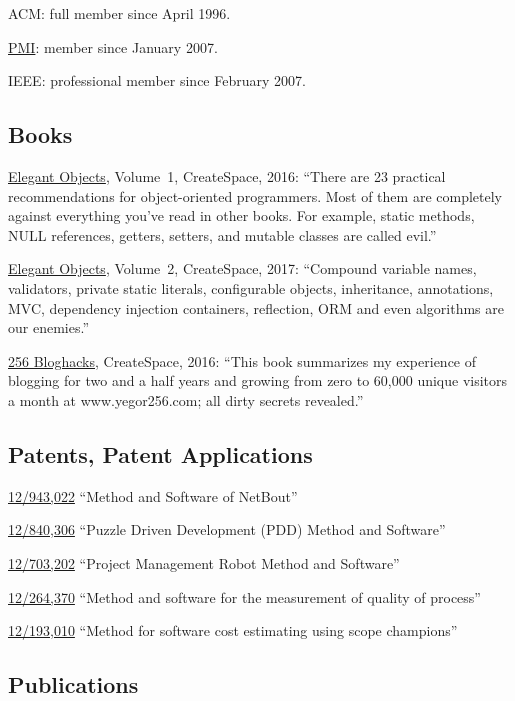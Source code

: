 \documentclass[12pt]{article}
\begin{document}
ACM: full member since April 1996.

\href{https://certification.pmi.org/registry.aspx}{PMI}: member since January 2007.

IEEE: professional member since February 2007.

\subsection*{Books}

\href{https://amzn.to/2E5UHqZ}{Elegant Objects}, Volume~1, CreateSpace, 2016:
``There are 23 practical recommendations for object-oriented programmers. Most of them are completely
against everything you've read in other books.
For example, static methods, NULL references, getters, setters, and
mutable classes are called evil.''

\href{https://amzn.to/2J2s5T4}{Elegant Objects}, Volume~2, CreateSpace, 2017:
``Compound variable names, validators, private static literals, configurable objects, inheritance,
annotations, MVC, dependency injection containers, reflection, ORM and even algorithms are our enemies.''

\href{https://amzn.to/2GkuyXf}{256 Bloghacks}, CreateSpace, 2016:
``This book summarizes my experience of blogging for two and a half years and growing from zero to 60,000
unique visitors a month at www.yegor256.com; all dirty secrets revealed.''

\subsection*{Patents, Patent Applications}

\href{https://patents.google.com/patent/US20120117164}{12/943,022}
``Method and Software of NetBout''

\href{https://patents.google.com/patent/US20120023476}{12/840,306}
``Puzzle Driven Development (PDD) Method and Software''

\href{https://patents.google.com/patent/US20110196798}{12/703,202}
``Project Management Robot Method and Software''

\href{https://patents.google.com/patent/US20100114638}{12/264,370}
``Method and software for the measurement of quality of process''

\href{https://patents.google.com/patent/US20100042968}{12/193,010}
``Method for software cost estimating using scope champions''

\subsection*{Publications}
\end{document}
